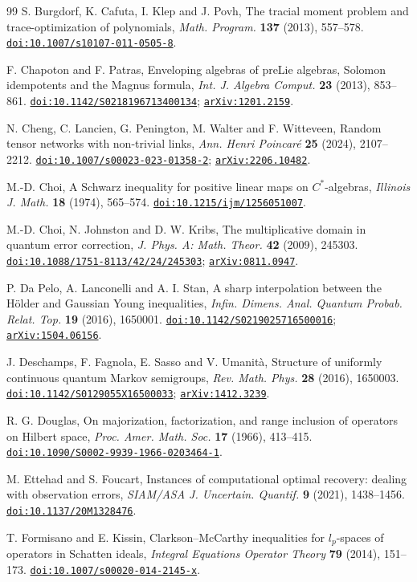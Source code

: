 \documentclass[11pt,a4paper]{amsart}
\numberwithin{equation}{section}
\theoremstyle{definition}
\theoremstyle{remark}
\newcommand{\arxiv}[1]{\href{https://arxiv.org/abs/#1}{\nolinkurl{arXiv:#1}}}
\newcommand{\doi}[1]{\href{https://doi.org/#1}{\nolinkurl{doi:#1}}}
\begin{document}
\begin{thebibliography}{99}
 S. Burgdorf, K. Cafuta, I. Klep and J. Povh,
The tracial moment problem and trace-optimization of polynomials,
\emph{Math. Program.} \textbf{137} (2013), 557--578.
\doi{10.1007/s10107-011-0505-8}.

 F. Chapoton and F. Patras,
Enveloping algebras of preLie algebras, Solomon idempotents and the Magnus formula,
\emph{Int. J. Algebra Comput.} \textbf{23} (2013), 853--861.
\doi{10.1142/S0218196713400134}; \arxiv{1201.2159}.

 N. Cheng, C. Lancien, G. Penington, M. Walter and F. Witteveen,
Random tensor networks with non-trivial links,
\emph{Ann. Henri Poincar\'e} \textbf{25} (2024), 2107--2212.
\doi{10.1007/s00023-023-01358-2}; \arxiv{2206.10482}.

 M.-D. Choi, A Schwarz inequality for positive linear maps on $C^*$-algebras,
\emph{Illinois J. Math.} \textbf{18} (1974), 565--574. \doi{10.1215/ijm/1256051007}.

 M.-D. Choi, N. Johnston and D. W. Kribs,
The multiplicative domain in quantum error correction,
\emph{J. Phys. A: Math. Theor.} \textbf{42} (2009), 245303.
\doi{10.1088/1751-8113/42/24/245303}; \arxiv{0811.0947}.

 P. Da Pelo, A. Lanconelli and A. I. Stan,
A sharp interpolation between the H\"older and Gaussian Young inequalities,
\emph{Infin. Dimens. Anal. Quantum Probab. Relat. Top.} \textbf{19} (2016), 1650001.
\doi{10.1142/S0219025716500016}; \arxiv{1504.06156}.

 J. Deschamps, F. Fagnola, E. Sasso and V. Umanit\`a,
Structure of uniformly continuous quantum Markov semigroups,
\emph{Rev. Math. Phys.} \textbf{28} (2016), 1650003.
\doi{10.1142/S0129055X16500033}; \arxiv{1412.3239}.

 R. G. Douglas,
On majorization, factorization, and range inclusion of operators on Hilbert space,
\emph{Proc. Amer. Math. Soc.} \textbf{17} (1966), 413--415. \doi{10.1090/S0002-9939-1966-0203464-1}.

 M. Ettehad and S. Foucart,
Instances of computational optimal recovery: dealing with observation errors,
\emph{SIAM/ASA J. Uncertain. Quantif.} \textbf{9} (2021), 1438--1456.
\doi{10.1137/20M1328476}.

 T. Formisano and E. Kissin,
Clarkson--McCarthy inequalities for $l_p$-spaces of operators in Schatten ideals,
\emph{Integral Equations Operator Theory} \textbf{79} (2014), 151--173.
\doi{10.1007/s00020-014-2145-x}.


\end{thebibliography}
\end{document}
